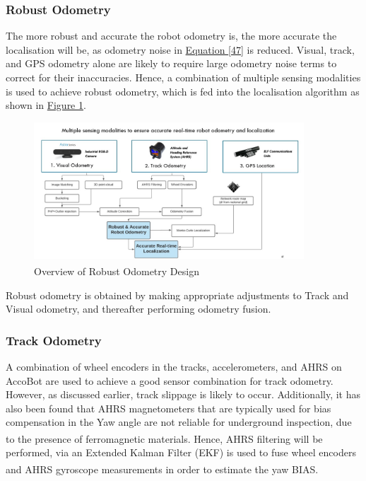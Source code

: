\documentclass[11pt]{article}		%
\newcommand{\supercite}[1]{\textsuperscript{\cite{#1}}}		%
\newcommand{\figref}[1]{\hyperref[#1]{Figure \ref*{#1}}}    %
\newcommand{\equationref}[1]{\hyperref[#1]{Equation \ref*{#1}}}     %
\begin{document}
	\subsubsection{Robust Odometry}
	The more robust and accurate the robot odometry is, the more accurate the localisation will be, as odometry noise in \equationref{47} is reduced. Visual, track, and GPS odometry alone are likely to require large odometry noise terms to correct for their inaccuracies. Hence, a combination of multiple sensing modalities is used to achieve robust odometry, which is fed into the localisation algorithm as shown in \figref{localisationChart}.  
										\begin{figure}[h]
				\centering
				\includegraphics[width=0.9\textwidth]{robustodometry.jpg}
				\caption{Overview of Robust Odometry Design\supercite{ELFTransmitter}}
				\label{localisationChart}
			\end{figure}
			
	Robust odometry is obtained by making appropriate adjustments to Track and Visual odometry, and thereafter performing odometry fusion. 
  \subsubsection{Track Odometry}
		A combination of wheel encoders in the tracks, accelerometers, and AHRS on AccoBot are used to achieve a good sensor combination for track odometry. However, as discussed earlier, track slippage is likely to occur. Additionally, it has also been found that AHRS magnetometers that are typically used for bias compensation in the Yaw angle are not reliable for underground inspection, due to the presence of ferromagnetic materials\supercite{AHRSinaccuracy}. Hence, AHRS filtering will be performed, via an Extended Kalman Filter (EKF) is used to fuse wheel encoders and AHRS gyroscope measurements in order to estimate the yaw BIAS\supercite{kalmanfilter}. 
\end{document}

